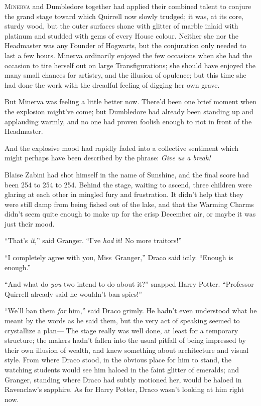 
\lettrine{M}{inerva} and
Dumbledore together had applied their combined talent to conjure the grand
stage toward which Quirrell now slowly trudged; it was, at its core, sturdy
wood, but the outer surfaces shone with glitter of marble inlaid with platinum
and studded with gems of every House colour. Neither she nor the Headmaster was
any Founder of Hogwarts, but the conjuration only needed to last a few hours.
Minerva ordinarily enjoyed the few occasions when she had the occasion to tire
herself out on large Transfigurations; she should have enjoyed the many small
chances for artistry, and the illusion of opulence; but this time she had done
the work with the dreadful feeling of digging her own grave.

But Minerva was feeling a little better now. There’d been one brief moment when
the explosion might’ve come; but Dumbledore had already been standing up and
applauding warmly, and no one had proven foolish enough to riot in front of the
Headmaster.

And the explosive mood had rapidly faded into a collective sentiment which
might perhaps have been described by the phrase: \emph{Give us a break!}

Blaise Zabini had shot himself in the name of Sunshine, and the final score had
been 254 to 254 to 254.
\later
Behind the stage, waiting to ascend, three children were glaring at each other
in mingled fury and frustration. It didn’t help that they were still damp from
being fished out of the lake, and that the Warming Charms didn’t seem quite
enough to make up for the crisp December air, or maybe it was just their mood.

“That’s \emph{it},” said Granger. “I’ve \emph{had} it! No more traitors!”

“I completely agree with you, Miss~Granger,” Draco said icily. “Enough is
enough.”

“And what do \emph{you} two intend to do about it?” snapped Harry Potter.
“Professor Quirrell already said he wouldn’t ban spies!”

“We’ll ban them \emph{for} him,” said Draco grimly. He hadn’t even understood
what he meant by the words as he said them, but the very act of speaking seemed
to crystallize a plan—
\later
The stage really was well done, at least for a temporary structure; the makers
hadn’t fallen into the usual pitfall of being impressed by their own illusion
of wealth, and knew something about architecture and visual style. From where
Draco stood, in the obvious place for him to stand, the watching students would
see him haloed in the faint glitter of emeralds; and Granger, standing where
Draco had subtly motioned her, would be haloed in Ravenclaw’s sapphire. As for
Harry Potter, Draco wasn’t looking at him right now.

